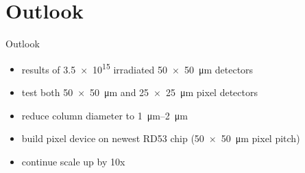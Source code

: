 \section{Outlook}
\begin{frame}{Outlook}

	\begin{minipage}[c][4cm]{\textwidth}
		\begin{itemize}\itemfill
			\item results of \SI{3.5e15}{\ncm} irradiated \SI{50x50}{\micro\meter} detectors
			\item test both \SI{50x50}{\micro\meter} and \SI{25x25}{\micro\meter} pixel detectors
			\item reduce column diameter to \SIrange{1}{2}{\micro\meter}
			\item build pixel device on newest RD53 chip (\SI{50x50}{\micro\meter} pixel pitch)
			\item continue scale up by 10x
		\end{itemize}
	\end{minipage}
	
\end{frame}
